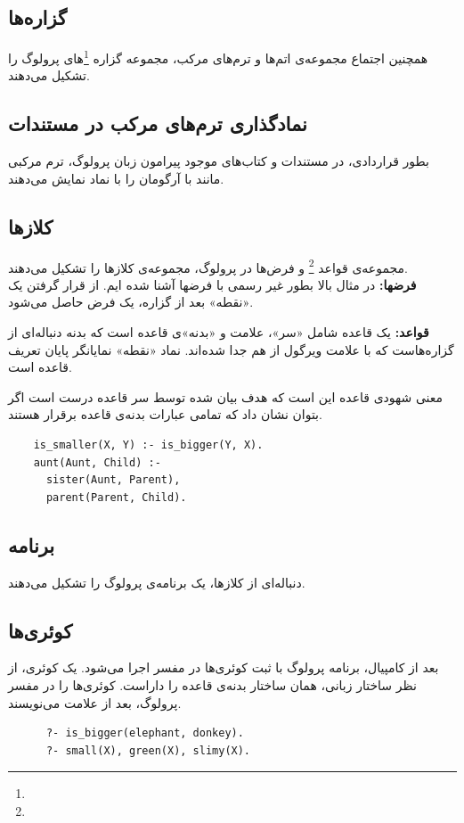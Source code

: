 \documentclass{article}
\begin{document}
\subsection{گزاره‌ها}
همچنین اجتماع مجموعه‌ی اتم‌ها و ترم‌های مرکب، مجموعه گزاره‌ \footnote{}های پرولوگ را تشکیل می‌دهند.

\subsection{نمادگذاری ترم‌های مرکب در مستندات}
بطور قراردادی، در مستندات و کتاب‌های موجود پیرامون زبان پرولوگ،
ترم مرکبی مانند  با  آرگومان را با نماد
 نمایش می‌دهند.
\clearpage
\subsection{کلاز‌ها}
مجموعه‌ی قواعد
\footnote{}
و فرض‌ها در پرولوگ، مجموعه‌ی کلاز‌ها را تشکیل می‌دهند.
\\
{\bf فرضها:} در مثال بالا بطور غیر رسمی با فرضها آشنا شده ایم.
از قرار گرفتن یک «نقطه» بعد از گزاره، یک فرض حاصل می‌شود.
  \begin{flushleft}
  \end{flushleft}
{\bf قواعد:} یک قاعده شامل «سر»، علامت \lr{\tt :-} و «بدنه»ی قاعده است که بدنه
  دنباله‌ای از گزاره‌هاست که با علامت ویرگول از هم جدا شده‌اند.
  نماد «نقطه» نمایانگر پایان تعریف قاعده است.


  معنی شهودی قاعده این است که هدف بیان شده توسط سر قاعده درست است اگر بتوان نشان داد
  که تمامی عبارات بدنه‌ی قاعده برقرار هستند.
  \begin{verbatim}
    is_smaller(X, Y) :- is_bigger(Y, X).
    aunt(Aunt, Child) :-
      sister(Aunt, Parent),
      parent(Parent, Child).
  \end{verbatim}

\clearpage
\subsection{برنامه}
دنباله‌ای از کلاز‌ها، یک برنامه‌ی پرولوگ را تشکیل می‌دهند.

\subsection{کوئری‌ها}
بعد از کامپیال، برنامه پرولوگ با ثبت کوئری‌ها در مفسر اجرا می‌شود.
یک کوئری، از نظر ساختار زبانی، همان ساختار بدنه‌ی قاعده را داراست.
کوئری‌ها را در مفسر پرولوگ، بعد از علامت  می‌نویسند.
  \begin{verbatim}
      ?- is_bigger(elephant, donkey).
      ?- small(X), green(X), slimy(X).
  \end{verbatim}
\clearpage
\end{document}
